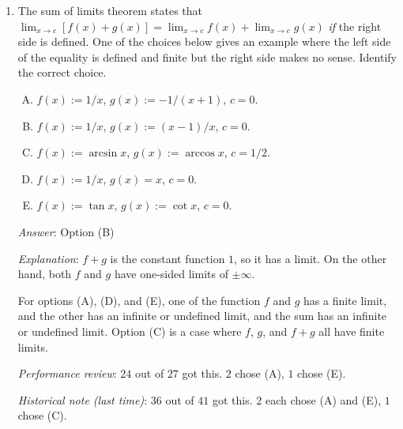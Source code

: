\documentclass[10pt]{amsart}
\begin{document}
\begin{enumerate}
  \begin{enumerate}[(A)]
  \item $0.2$
  \item $0.3$
  \item $0.5$
  \item $0.7$
  \item $0.9$
  \end{enumerate}

  {\em Answer}: Option (A)

  {\em Explanation}: We choose the {\em smaller} of the $\delta$s to
  guarantee that {\em both} $f$ and $g$ are within their respective
  $\varepsilon$-distances of the targets -- $0.7$ in the case of $f$ and
  $1.6$ in the case of $g$. Now, the triangle inequality guarantees
  that $f + g$ is within $2.3$ of its proposed limit.

  {\em Performance review}: $19$ out of $27$ got this. $6$ chose (D),
  $1$ each chose (C) and (E).

  {\em Historical note (last time)}: $36$ out of $41$ got this. $3$ chose (D),
  $1$ each chose (C) and (E).

\item The sum of limits theorem states that $\displaystyle \lim_{x \to c} [f(x) +
  g(x)] = \displaystyle \lim_{x \to c} f(x) + \displaystyle \lim_{x \to c} g(x)$ {\em if} the
  right side is defined. One of the choices below gives an example
  where the left side of the equality is defined and finite but the right side
  makes no sense. Identify the correct choice.

  \begin{enumerate}[(A)]
  \item $f(x) := 1/x$, $g(x) := -1/(x + 1)$, $c = 0$.
  \item $f(x) := 1/x$, $g(x) := (x - 1)/x$, $c = 0$.
  \item $f(x) := \arcsin x$, $g(x) := \arccos x$, $c = 1/2$.
  \item $f(x) := 1/x$, $g(x) = x$, $c = 0$.
  \item $f(x) := \tan x$, $g(x) := \cot x$, $c = 0$.
  \end{enumerate}

  {\em Answer}: Option (B)

  {\em Explanation}: $f + g$ is the constant function $1$, so it has a
  limit. On the other hand, both $f$ and $g$ have one-sided limits of
  $\pm \infty$.

  For options (A), (D), and (E), one of the function $f$ and $g$ has a
  finite limit, and the other has an infinite or undefined limit, and
  the sum has an infinite or undefined limit. Option (C) is a case
  where $f$, $g$, and $f + g$ all have finite limits.

  {\em Performance review}: $24$ out of $27$ got this. $2$ chose (A),
  $1$ chose (E).

  {\em Historical note (last time)}: $36$ out of $41$ got this. $2$ each chose
  (A) and (E), $1$ chose (C).

\end{enumerate}
\end{document}
